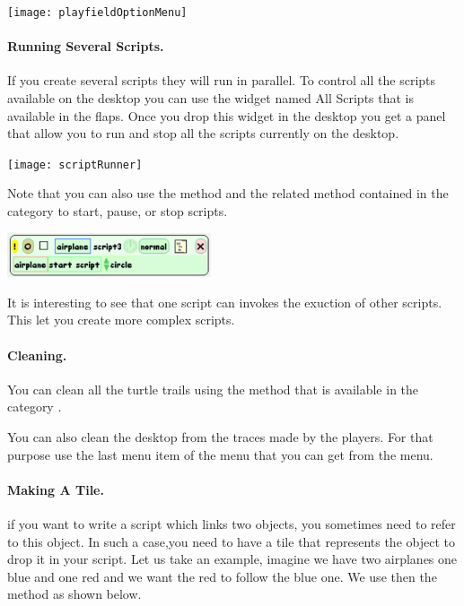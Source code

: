 \begin{center}\texttt{[image: playfieldOptionMenu]}\end{center}

\paragraph{Running Several Scripts.} If you create several scripts they will run in parallel. To control all the scripts available on the desktop you can use the widget named All Scripts that is available in the  flaps. Once you drop this widget in the desktop you get a panel that allow you to run and stop all the scripts currently on the desktop. 

\begin{center}\texttt{[image: scriptRunner]}\end{center}

Note that you can also use the method  and the related method contained in the category  to start, pause, or stop scripts.

\begin{center}\includegraphics[width=6cm]{startScript}\end{center}
It is interesting to see that one script can invokes the exuction of other scripts. This let you create more complex scripts. 

\paragraph{Cleaning.} You can clean all the turtle trails using the method  that is available in the category .

You can also clean the desktop from the traces  made by the players. For that purpose use the last menu item of the menu   that you can get from the  menu. 

\paragraph{Making A Tile.}
if you want to write a script which links two objects, you sometimes need to refer to this object. In such a case,you need to have a tile that represents the object to drop it in your script. Let us take an example, imagine we have two airplanes one blue and one red and we want the red to follow the blue one. We use then the method  as shown below. 

